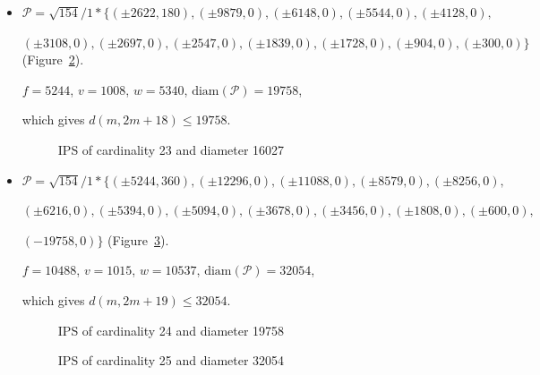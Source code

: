 \documentclass[12pt]{article}
\theoremstyle{theorem}
\theoremstyle{dfn}
\theoremstyle{remark}
\begin{document}
\begin{itemize}
\item
$\mathcal{P}=\sqrt{154}/{1} * \{ (\pm 2622, 180),
(\pm 9879 , 0),
(\pm 6148 , 0),
(\pm 5544 , 0),
(\pm 4128 , 0),
$

$
(\pm 3108 , 0),
(\pm 2697 , 0),
(\pm 2547 , 0),
(\pm 1839 , 0),
(\pm 1728 , 0),
(\pm 904 , 0),
(\pm 300 , 0)\}
$
(Figure~\ref{picture_20.png}).

$f = 5244$, $v = 1008$, $w = 5340$, $\operatorname{diam(\mathcal{P})} = 19758$,

which gives $d(m, 2m + 18) \leq 19758$.


\begin{figure}[h!]
\parbox{0.85\linewidth}{\caption{IPS of cardinality 23 and diameter 16027}
\label{picture_19.png}}
\end{figure}


\item
$\mathcal{P}=\sqrt{154}/{1} * \{ (\pm 5244, 360),
(\pm 12296 , 0),
(\pm 11088 , 0),
(\pm 8579 , 0),
(\pm 8256 , 0),
$

$
(\pm 6216 , 0),
(\pm 5394 , 0),
(\pm 5094 , 0),
(\pm 3678 , 0),
(\pm 3456 , 0),
(\pm 1808 , 0),
(\pm 600 , 0),
$

$
(-19758 , 0)\}
$
(Figure~\ref{picture_21.png}).

$f = 10488$, $v = 1015$, $w = 10537$, $\operatorname{diam(\mathcal{P})} = 32054$,

which gives $d(m, 2m + 19) \leq 32054$.


\begin{figure}[h!]
\parbox{0.85\linewidth}{\caption{IPS of cardinality 24 and diameter 19758}
\label{picture_20.png}}
\end{figure}


\begin{figure}[h!]
\parbox{1\linewidth}{\caption{IPS of cardinality 25 and diameter 32054}
\label{picture_21.png}}
\end{figure}



\end{itemize}
\end{document}

